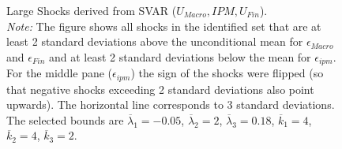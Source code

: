 \documentclass[a4paper,11pt,listof=nochaptergap,oneside,pointednumbers,bibtotoc,bigheadings,liststotoc]{scrbook}
\theoremstyle{mysatz}
\theoremstyle{mydefinition}
\theoremstyle{mybemerkung}
\begin{document}
\begin{itemize}
\begin{figure}[!h]
   \centering
   \setlength\fboxsep{0pt}
   \setlength\fboxrule{0pt}
      \caption[Large Shocks derived from SVAR ($U_{Macro}, IPM, U_{Fin}$).]{Large Shocks derived from SVAR ($U_{Macro}, IPM, U_{Fin}$).\\
      \textit{Note:}  The figure shows all shocks in the identified set that are at least 2 standard deviations above the unconditional mean for $\epsilon_{Macro}$ and $\epsilon_{Fin}$ and at least 2 standard deviations below the mean for $\epsilon_{ipm}$. For the middle pane ($\epsilon_{ipm}$) the sign of the shocks were flipped (so that negative shocks exceeding 2 standard deviations also point upwards). The horizontal line corresponds to 3 standard deviations. The selected bounds are $\overline{\lambda}_1 = -0.05$, $\overline{\lambda}_2 = 2$, $\overline{\lambda}_3 = 0.18$, $\overline{k}_1 = 4$, $\overline{k}_2 = 4$, $\overline{k}_3 = 2$.}   \label{fig:ludvigsonetal_timeseries_e_largeshocks}
\end{figure}



\end{itemize}
\end{document}
